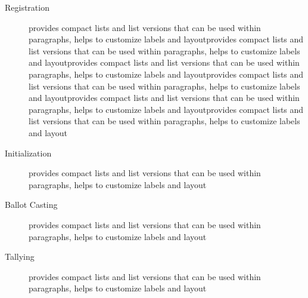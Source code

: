 \begin{description}
  \item[Registration] provides compact lists and list versions
    that can be used within paragraphs, helps to customize
    labels and layoutprovides compact lists and list versions
    that can be used within paragraphs, helps to customize
    labels and layoutprovides compact lists and list versions
    that can be used within paragraphs, helps to customize
    labels and layoutprovides compact lists and list versions
    that can be used within paragraphs, helps to customize
    labels and layoutprovides compact lists and list versions
    that can be used within paragraphs, helps to customize
    labels and layoutprovides compact lists and list versions
    that can be used within paragraphs, helps to customize
    labels and layout
    
  \item[Initialization] provides compact lists and list versions
    that can be used within paragraphs, helps to customize
    labels and layout
    
  \item[Ballot Casting] provides compact lists and list versions
    that can be used within paragraphs, helps to customize
    labels and layout
    
  \item[Tallying] provides compact lists and list versions
    that can be used within paragraphs, helps to customize
    labels and layout    

\end{description}

